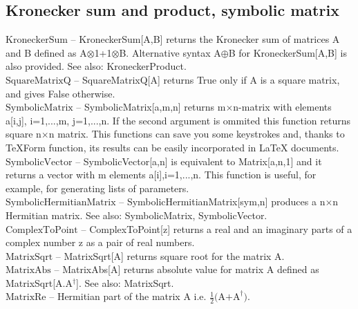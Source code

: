 \subsection{Kronecker sum and product, symbolic matrix}

\noindent\textbf{$ \text{KroneckerSum} $ }-- KroneckerSum[A,B] returns the Kronecker sum of matrices A and B defined as A$\otimes $1+1$\otimes $B. Alternative syntax A$\oplus $B for KroneckerSum[A,B] is also provided. See also: KroneckerProduct.$  $\\

\noindent\textbf{$ \text{SquareMatrixQ} $ }-- SquareMatrixQ[A] returns True only if A is a square matrix, and gives False otherwise.$  $\\

\noindent\textbf{$ \text{SymbolicMatrix} $ }-- SymbolicMatrix[a,m,n] returns m$\times $n-matrix with elements a[i,j], i=1,...,m, j=1,...,n. If the second argument is ommited this function returns square n$\times $n matrix. This functions can save you some keystrokes and, thanks to TeXForm function, its results can be easily incorporated in LaTeX documents.$  $\\

\noindent\textbf{$ \text{SymbolicVector} $ }-- SymbolicVector[a,n] is equivalent to Matrix[a,n,1] and it returns a vector with m elements a[i],i=1,...,n. This function is useful, for example, for generating lists of parameters.$  $\\

\noindent\textbf{$ \text{SymbolicHermitianMatrix} $ }-- SymbolicHermitianMatrix[sym,n] produces a n$\times $n Hermitian matrix. See also: SymbolicMatrix, SymbolicVector.$  $\\

\noindent\textbf{$ \text{ComplexToPoint} $ }-- ComplexToPoint[z] returns a real and an imaginary parts of a complex number z as a pair of real numbers.$  $\\

\noindent\textbf{$ \text{MatrixSqrt} $ }-- MatrixSqrt[A] returns square root for the matrix A.$  $\\

\noindent\textbf{$ \text{MatrixAbs} $ }-- MatrixAbs[A] returns absolute value for matrix A defined as MatrixSqrt[A.A$  ^{\dagger } $]. See also: MatrixSqrt.$  $\\

\noindent\textbf{$ \text{MatrixRe} $ }-- Hermitian part of the matrix A i.e. $ \frac{1}{2}\text{(A+A} ^{\dagger }\text{).} $\\

